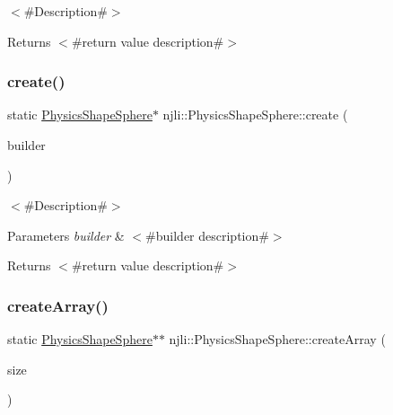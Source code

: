 $<$\#\+Description\#$>$

\begin{DoxyReturn}{Returns}
$<$\#return value description\#$>$ 
\end{DoxyReturn}
\mbox{\label{classnjli_1_1_physics_shape_sphere_ac0cc733b465cf06dc04f6d9949de2c1c}} 
\subsubsection{\texorpdfstring{create()}{create()}\hspace{0.1cm}{\footnotesize\ttfamily [2/2]}}
{\footnotesize\ttfamily static \mbox{\hyperlink{classnjli_1_1_physics_shape_sphere}{Physics\+Shape\+Sphere}}$\ast$ njli\+::\+Physics\+Shape\+Sphere\+::create (\begin{DoxyParamCaption}\item[{const \mbox{\hyperlink{classnjli_1_1_physics_shape_sphere_builder}{Physics\+Shape\+Sphere\+Builder}} \&}]{builder }\end{DoxyParamCaption})\hspace{0.3cm}{\ttfamily [static]}}

$<$\#\+Description\#$>$


\begin{DoxyParams}{Parameters}
{\em builder} & $<$\#builder description\#$>$\\
\hline
\end{DoxyParams}
\begin{DoxyReturn}{Returns}
$<$\#return value description\#$>$ 
\end{DoxyReturn}
\mbox{\label{classnjli_1_1_physics_shape_sphere_aa7044286a73f1dba93773bdc3d1ccc81}} 
\subsubsection{\texorpdfstring{create\+Array()}{createArray()}}
{\footnotesize\ttfamily static \mbox{\hyperlink{classnjli_1_1_physics_shape_sphere}{Physics\+Shape\+Sphere}}$\ast$$\ast$ njli\+::\+Physics\+Shape\+Sphere\+::create\+Array (\begin{DoxyParamCaption}\item[{const \mbox{\hyperlink{_util_8h_a10e94b422ef0c20dcdec20d31a1f5049}{u32}}}]{size }\end{DoxyParamCaption})\hspace{0.3cm}{\ttfamily [static]}}


